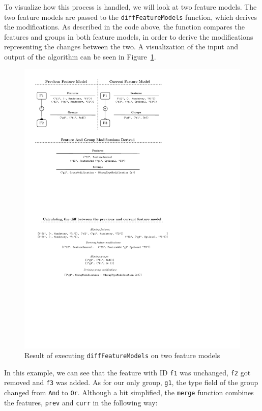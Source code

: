 \documentclass[a4paper,english]{ifimaster}
\begin{document}
To visualize how this process is handled, we will look at two feature models. The two feature models are passed to the \texttt{diff\-Feature\-Models} function, which derives the modifications. As described in the code above, the function compares the features and groups in both feature models, in order to derive the modifications representing the changes between the two. A visualization of the input and output of the algorithm can be seen in Figure~\ref{fig:diff_feature_models_visualized}.

\begin{figure}[htpb]
  \centering
  \includegraphics[]{feature_model_diff_visualized.pdf}
  \caption{Result of executing \texttt{diffFeatureModels} on two feature models}%
  \label{fig:diff_feature_models_visualized}
\end{figure}

In this example, we can see that the feature with ID \texttt{f1} was unchanged, \texttt{f2} got removed and \texttt{f3} was added. As for our only group, \texttt{g1}, the type field of the group changed from \texttt{And} to \texttt{Or}. Although a bit simplified, the \texttt{merge} function combines the features, \texttt{prev} and \texttt{curr} in the following way:
\end{document}
